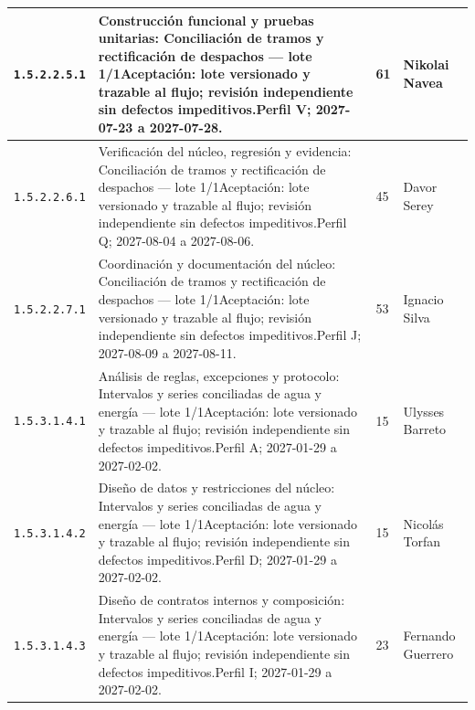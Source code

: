 \begin{longtable}{L{29mm}L{80mm}R{12mm}L{28mm}}
\texttt{1.\allowbreak{}5.\allowbreak{}2.\allowbreak{}2.\allowbreak{}5.\allowbreak{}1} & Construcción funcional y pruebas unitarias: Conciliación de tramos y rectificación de despachos — lote 1/1\newline Aceptación: lote versionado y trazable al flujo; revisión independiente sin defectos impeditivos.\newline Perfil V; 2027-07-23 a 2027-07-28. & 61 & Nikolai Navea\\\hline
\texttt{1.\allowbreak{}5.\allowbreak{}2.\allowbreak{}2.\allowbreak{}6.\allowbreak{}1} & Verificación del núcleo, regresión y evidencia: Conciliación de tramos y rectificación de despachos — lote 1/1\newline Aceptación: lote versionado y trazable al flujo; revisión independiente sin defectos impeditivos.\newline Perfil Q; 2027-08-04 a 2027-08-06. & 45 & Davor Serey\\\hline
\texttt{1.\allowbreak{}5.\allowbreak{}2.\allowbreak{}2.\allowbreak{}7.\allowbreak{}1} & Coordinación y documentación del núcleo: Conciliación de tramos y rectificación de despachos — lote 1/1\newline Aceptación: lote versionado y trazable al flujo; revisión independiente sin defectos impeditivos.\newline Perfil J; 2027-08-09 a 2027-08-11. & 53 & Ignacio Silva\\\hline
\texttt{1.\allowbreak{}5.\allowbreak{}3.\allowbreak{}1.\allowbreak{}4.\allowbreak{}1} & Análisis de reglas, excepciones y protocolo: Intervalos y series conciliadas de agua y energía — lote 1/1\newline Aceptación: lote versionado y trazable al flujo; revisión independiente sin defectos impeditivos.\newline Perfil A; 2027-01-29 a 2027-02-02. & 15 & Ulysses Barreto\\\hline
\texttt{1.\allowbreak{}5.\allowbreak{}3.\allowbreak{}1.\allowbreak{}4.\allowbreak{}2} & Diseño de datos y restricciones del núcleo: Intervalos y series conciliadas de agua y energía — lote 1/1\newline Aceptación: lote versionado y trazable al flujo; revisión independiente sin defectos impeditivos.\newline Perfil D; 2027-01-29 a 2027-02-02. & 15 & Nicolás Torfan\\\hline
\texttt{1.\allowbreak{}5.\allowbreak{}3.\allowbreak{}1.\allowbreak{}4.\allowbreak{}3} & Diseño de contratos internos y composición: Intervalos y series conciliadas de agua y energía — lote 1/1\newline Aceptación: lote versionado y trazable al flujo; revisión independiente sin defectos impeditivos.\newline Perfil I; 2027-01-29 a 2027-02-02. & 23 & Fernando Guerrero\\\hline

\end{longtable}

